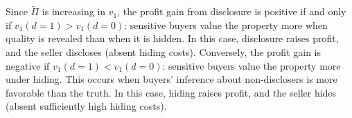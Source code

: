 Since $\tilde{\Pi}$ is increasing in $v_1$, the profit gain from disclosure is positive if and only if $v_1(d=1) > v_1(d=0)$: sensitive buyers value the property more when quality is revealed than when it is hidden. In this case, disclosure raises profit, and the seller discloses (absent hiding costs). Conversely, the profit gain is negative if $v_1(d=1) < v_1(d=0)$: sensitive buyers value the property more under hiding. This occurs when buyers' inference about non-disclosers is more favorable than the truth. In this case, hiding raises profit, and the seller hides (absent sufficiently high hiding costs).
